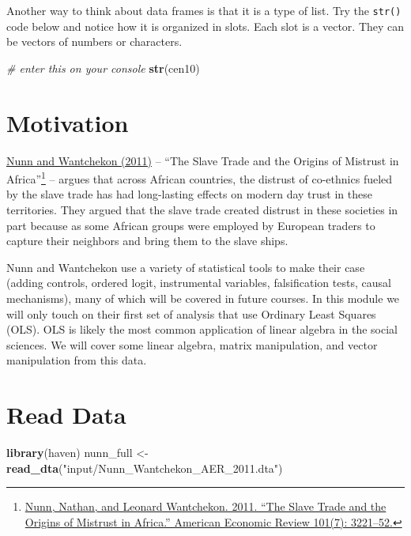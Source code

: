 \documentclass[]{book}
\newenvironment{Shaded}{\begin{snugshade}}{\end{snugshade}}
\newcommand{\CommentTok}[1]{\textcolor[rgb]{0.56,0.35,0.01}{\textit{#1}}}
\newcommand{\KeywordTok}[1]{\textcolor[rgb]{0.13,0.29,0.53}{\textbf{#1}}}
\newcommand{\NormalTok}[1]{#1}
\newcommand{\StringTok}[1]{\textcolor[rgb]{0.31,0.60,0.02}{#1}}
\let\rmarkdownfootnote\footnote%
\def\footnote{\protect\rmarkdownfootnote}
\theoremstyle{definition}
\theoremstyle{definition}
\theoremstyle{definition}
\theoremstyle{remark}
\begin{document}
Another way to think about data frames is that it is a type of list. Try the \texttt{str()} code below and notice how it is organized in slots. Each slot is a vector. They can be vectors of numbers or characters.

\begin{Shaded}
\begin{Highlighting}[]
\CommentTok{# enter this on your console}
\KeywordTok{str}\NormalTok{(cen10)}
\end{Highlighting}
\end{Shaded}

\hypertarget{motivation}{%
\section{Motivation}\label{motivation}}

\href{https://dash.harvard.edu/bitstream/handle/1/11986331/nunn-slave-trade.pdf}{Nunn and Wantchekon (2011)} -- ``The Slave Trade and the Origins of Mistrust in Africa''\footnote{\href{https://dash.harvard.edu/bitstream/handle/1/11986331/nunn-slave-trade.pdf}{Nunn, Nathan, and Leonard Wantchekon. 2011. ``The Slave Trade and the Origins of Mistrust in Africa.'' American Economic Review 101(7): 3221--52.}} -- argues that across African countries, the distrust of co-ethnics fueled by the slave trade has had long-lasting effects on modern day trust in these territories. They argued that the slave trade created distrust in these societies in part because as some African groups were employed by European traders to capture their neighbors and bring them to the slave ships.

Nunn and Wantchekon use a variety of statistical tools to make their case (adding controls, ordered logit, instrumental variables, falsification tests, causal mechanisms), many of which will be covered in future courses. In this module we will only touch on their first set of analysis that use Ordinary Least Squares (OLS). OLS is likely the most common application of linear algebra in the social sciences. We will cover some linear algebra, matrix manipulation, and vector manipulation from this data.

\hypertarget{read-data-1}{%
\section{Read Data}\label{read-data-1}}

\begin{Shaded}
\begin{Highlighting}[]
\KeywordTok{library}\NormalTok{(haven)}
\NormalTok{nunn_full <-}\StringTok{ }\KeywordTok{read_dta}\NormalTok{(}\StringTok{"input/Nunn_Wantchekon_AER_2011.dta"}\NormalTok{)}
\end{Highlighting}
\end{Shaded}
\end{document}
